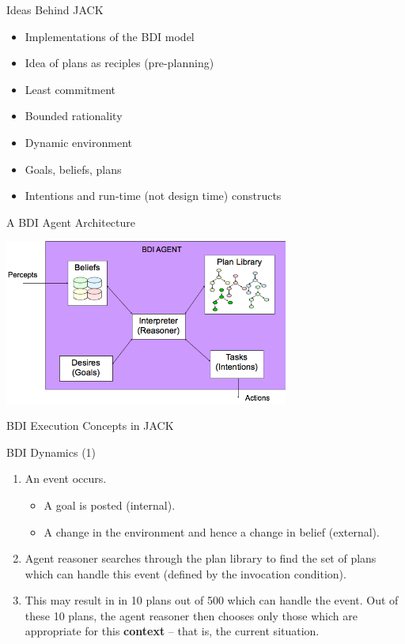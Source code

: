 \documentclass[aspectratio=1610,xcolor=dvipsnames,t]{beamer}
\begin{document}
\begin{frame}{Ideas Behind JACK} 
    \begin{itemize} 
        \item Implementations of the BDI model
        \item Idea of plans as reciples (pre-planning) 
        \item Least commitment 
        \item Bounded rationality
        \item Dynamic environment
        \item Goals, beliefs, plans
        \item Intentions and run-time (not design time) constructs
    \end{itemize} 
\end{frame} 

\begin{frame}{A BDI Agent Architecture} 
    \begin{center} 
        \includegraphics[width=0.7\textwidth]{reasoner} 
    \end{center} 
\end{frame} 

\begin{frame}{BDI Execution Concepts in JACK} 
\end{frame} 

\begin{frame}{BDI Dynamics (1)}
    \begin{enumerate}
        \item An event occurs.
            \begin{itemize} 
                \item A goal is posted (internal).
                \item A change in the environment and hence a change in 
                      belief (external). 
            \end{itemize} 
        \item Agent reasoner searches through the plan library to
              find the set of plans which can handle this event
              (defined by the invocation condition).
        \item This may result in in 10 plans out of 500 which can
              handle the event. Out of these 10 plans, the agent
              reasoner then chooses only those which are 
              appropriate for this \textbf{context} -- that is, 
              the current situation. 
    \end{enumerate} 
\end{frame} 
\end{document}
